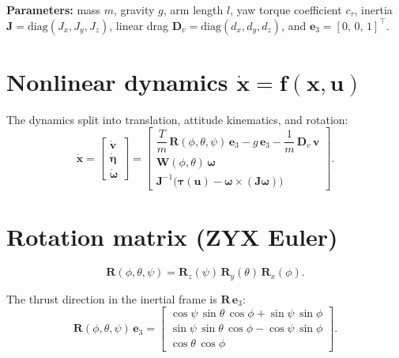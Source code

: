 \documentclass[11pt]{article}
\begin{document}
\textbf{Parameters:} mass $m$, gravity $g$, arm length $l$, yaw torque coefficient $c_\tau$,
inertia $\bm{J} = \mathrm{diag}(J_x,J_y,J_z)$, linear drag $\bm{D}_v = \mathrm{diag}(d_x,d_y,d_z)$,
and $\bm{e}_3 = [0,\,0,\,1]^\top$.

\section*{Nonlinear dynamics $\dot{\bm{x}} = \bm{f}(\bm{x},\bm{u})$}

The dynamics split into translation, attitude kinematics, and rotation:
\begin{equation}
  \dot{\bm{x}} =
  \begin{bmatrix}
    \dot{\bm{v}} \\ \dot{\bm{\eta}} \\ \dot{\bm{\omega}}
  \end{bmatrix}
  =
  \begin{bmatrix}
    \dfrac{T}{m}\,\bm{R}(\phi,\theta,\psi)\,\bm{e}_3
    - g\,\bm{e}_3
    - \dfrac{1}{m}\,\bm{D}_v\,\bm{v}
    \\[0.6em]
    \bm{W}(\phi,\theta)\,\bm{\omega}
    \\[0.3em]
    \bm{J}^{-1}\bigl( \bm{\tau}(\bm{u}) - \bm{\omega} \times (\bm{J}\bm{\omega}) \bigr)
  \end{bmatrix}.
\end{equation}

\section*{Rotation matrix (ZYX Euler)}

\begin{equation}
  \bm{R}(\phi,\theta,\psi)
  = \bm{R}_z(\psi)\,\bm{R}_y(\theta)\,\bm{R}_x(\phi).
\end{equation}

The thrust direction in the inertial frame is $\bm{R}\,\bm{e}_3$:
\begin{equation}
  \bm{R}(\phi,\theta,\psi)\,\bm{e}_3
  =
  \begin{bmatrix}
    \cos\psi\,\sin\theta\,\cos\phi + \sin\psi\,\sin\phi \\
    \sin\psi\,\sin\theta\,\cos\phi - \cos\psi\,\sin\phi \\
    \cos\theta\,\cos\phi
  \end{bmatrix}.
\end{equation}
\end{document}
